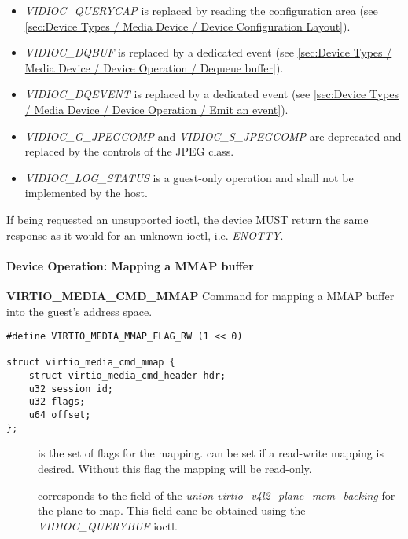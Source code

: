 \begin{itemize}
\item \textit{VIDIOC_QUERYCAP} is replaced by reading the configuration area
(see \ref{sec:Device Types / Media Device / Device Configuration Layout}).
\item \textit{VIDIOC_DQBUF} is replaced by a dedicated event
(see \ref{sec:Device Types / Media Device / Device Operation / Dequeue buffer}).
\item \textit{VIDIOC_DQEVENT} is replaced by a dedicated event
(see \ref{sec:Device Types / Media Device / Device Operation / Emit an event}).
\item \textit{VIDIOC_G_JPEGCOMP} and \textit{VIDIOC_S_JPEGCOMP} are deprecated
and replaced by the controls of the JPEG class.
\item \textit{VIDIOC_LOG_STATUS} is a guest-only operation and shall not be
implemented by the host.
\end{itemize}


If being requested an unsupported ioctl, the device MUST return the same
response as it would for an unknown ioctl, i.e. \textit{ENOTTY}.

\paragraph{Device Operation: Mapping a MMAP buffer}

\textbf{VIRTIO_MEDIA_CMD_MMAP} Command for mapping a MMAP buffer into the
guest's address space.

\begin{lstlisting}
#define VIRTIO_MEDIA_MMAP_FLAG_RW (1 << 0)

struct virtio_media_cmd_mmap {
	struct virtio_media_cmd_header hdr;
	u32 session_id;
	u32 flags;
	u64 offset;
};
\end{lstlisting}

\begin{description}
\item[] is the set of flags for the mapping. 
can be set if a read-write mapping is desired. Without this flag the mapping
will be read-only.
\item[] corresponds to the  field of the
\textit{union virtio_v4l2_plane_mem_backing} for the plane to map. This field
cane be obtained using the \textit{VIDIOC_QUERYBUF} ioctl.
\end{description}

